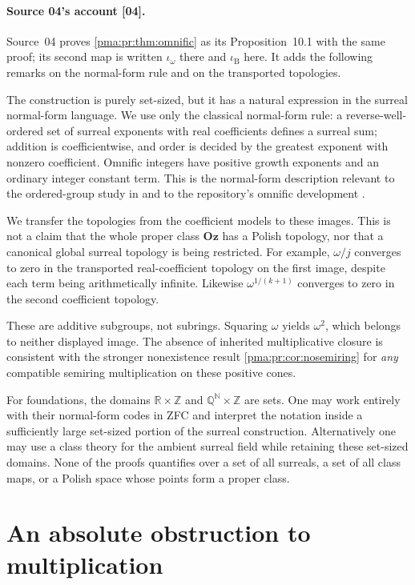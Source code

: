 \documentclass[11pt]{article}
\numberwithin{equation}{section}
\theoremstyle{definition}
\theoremstyle{remark}
\newcommand{\N}{\mathbb N}
\newcommand{\Z}{\mathbb Z}
\newcommand{\Q}{\mathbb Q}
\newcommand{\R}{\mathbb R}
\newcommand{\Oz}{\mathbf{Oz}}
\newcommand{\src}[1]{\textup{\textsf{\small[#1]}}}
\begin{document}
\paragraph{Source 04's account \src{04}.} Source~04 proves
\cref{pma:pr:thm:omnific} as its Proposition~10.1 with the same proof; its
second map is written $\iota_\omega$ there and $\iota_{\mathrm B}$ here. It
adds the following remarks on the normal-form rule and on the transported
topologies.

The construction is purely set-sized, but it has a natural expression in
the surreal normal-form language. We use only the classical normal-form
rule: a reverse-well-ordered set of surreal exponents with real
coefficients defines a surreal sum; addition is coefficientwise, and order
is decided by the greatest exponent with nonzero coefficient. Omnific
integers have positive growth exponents and an ordinary integer constant
term. This is the normal-form description relevant to the ordered-group
study in \cite{EhrlichKaplan} and to the repository's omnific development
\cite{proveit-surreal}.

We transfer the topologies from the coefficient models to these images.
This is not a claim that the whole proper class $\Oz$ has a Polish topology,
nor that a canonical global surreal topology is being restricted. For
example, $\omega/j$ converges to zero in the transported real-coefficient
topology on the first image, despite each term being arithmetically
infinite. Likewise $\omega^{1/(k+1)}$ converges to zero in the second
coefficient topology.

These are additive subgroups, not subrings. Squaring $\omega$ yields
$\omega^2$, which belongs to neither displayed image. The absence of
inherited multiplicative closure is consistent with the stronger
nonexistence result \cref{pma:pr:cor:nosemiring} for \emph{any} compatible
semiring multiplication on these positive cones.

For foundations, the domains $\R\times\Z$ and $\Q^{\N}\times\Z$ are sets.
One may work entirely with their normal-form codes in ZFC and interpret
the notation inside a sufficiently large set-sized portion of the
surreal construction. Alternatively one may use a class theory for the
ambient surreal field while retaining these set-sized domains. None of
the proofs quantifies over a set of all surreals, a set of all class maps,
or a Polish space whose points form a proper class.

\section{An absolute obstruction to multiplication}
\label{pma:pr:sec:multiplication}\label{pma:pr:s04:sec:multiplication}
\end{document}
